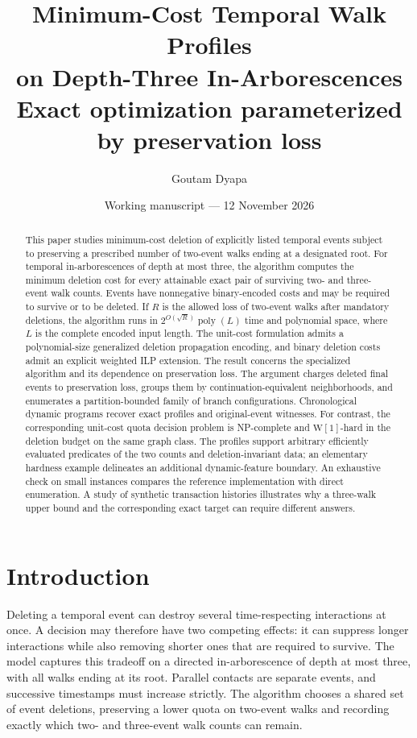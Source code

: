 \documentclass[11pt]{article}
\title{Minimum-Cost Temporal Walk Profiles\\[0.15em]
on Depth-Three In-Arborescences\\[0.4em]
\large Exact optimization parameterized by preservation loss}
\author{Goutam Dyapa}
\date{Working manuscript --- 12 November 2026}
\theoremstyle{remark}
\newcommand{\poly}{\operatorname{poly}}
\begin{document}
\maketitle
\begin{abstract}
This paper studies minimum-cost deletion of explicitly listed temporal events subject to
preserving a prescribed number of two-event walks ending at a designated root.
For temporal in-arborescences of depth at most three, the algorithm computes the minimum
deletion cost for every attainable exact pair of surviving two- and three-event
walk counts. Events have nonnegative binary-encoded costs and may be required
to survive or to be deleted. If $R$ is the allowed loss of two-event walks after mandatory deletions,
the algorithm runs in $2^{O(\sqrt R)}\poly(L)$ time and polynomial space,
where $L$ is the complete encoded input length. The unit-cost formulation
admits a polynomial-size generalized deletion propagation encoding, and
binary deletion costs admit an explicit weighted ILP extension. The result
concerns the specialized algorithm and its dependence on preservation loss. The argument
charges deleted final events to preservation loss, groups them by
continuation-equivalent neighborhoods, and enumerates a partition-bounded
family of branch configurations. Chronological dynamic programs recover exact
profiles and original-event witnesses. For contrast, the corresponding
unit-cost quota decision problem is NP-complete and $\mathrm{W}[1]$-hard in
the deletion budget on the same graph class. The profiles support arbitrary
efficiently evaluated predicates of the two counts and deletion-invariant
data; an elementary hardness example delineates an additional dynamic-feature
boundary. An exhaustive check on small instances compares the reference
implementation with direct enumeration. A study of synthetic
transaction histories illustrates why a three-walk upper bound and the
corresponding exact target can require different answers.
\end{abstract}

\section{Introduction}\label{sec:intro}

Deleting a temporal event can destroy several time-respecting interactions
at once. A decision may therefore have two competing effects: it can suppress
longer interactions while also removing shorter ones that are required to
survive. The model captures this tradeoff on a directed in-arborescence of depth at most three, with all walks
ending at its root. Parallel contacts are separate events, and successive
timestamps must increase strictly. The algorithm chooses a shared set of
event deletions, preserving a lower quota on two-event walks and recording
exactly which two- and three-event walk counts can remain.
\end{document}
